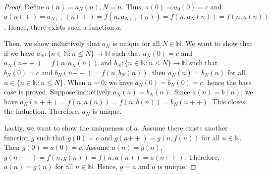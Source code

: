 \documentclass[12pt, letter]{article}
\begin{document}
\begin{proof}
    Define $a(n)=a_N(n), N=n$. Thus, $a(0)=a_0(0)=c$ and $a(n\mathtt{++})=a_{N\mathtt{++}}(n\mathtt{++})=f(n,a_{N\mathtt{++}}(n))=f(n,a_N(n))=f(n,a(n))$. Hence, there exists such a function $a$.

    Then, we show inductively that $a_N$ is unique for all $N\in\mathbb{N}$. We want to show that if we have $a_N:\{n\in\mathbb{N}:n\leq N\}\to \mathbb{N}$ such that $a_N(0)=c$ and $a_N(n\mathtt{++})=f(n,a_N(n))$
    and $b_N:\{n\in\mathbb{N}:n\leq N\}\to \mathbb{N}$ such that $b_N(0)=c$ and $b_N(n\mathtt{++})=f(n,b_N(n))$, then $a_N(n)=b_N(n)$ for all $n\in\{n\in\mathbb{N}:n\leq N\}$.
    When $n=0$, we have $a_N(0)=b_N(0)=c$, hence the base case is proved. Suppose inductively $a_N(n)=b_N(n)$. Since $a(n)=b(n)$, we have $a_N(n++)=f(n,a(n))=f(n,b(n))=b_N(n++)$. This closes the induction. 
    Therefore, $a_N$ is unique. 

    Lastly, we want to show the uniqueness of $a$. Assume there exists another function $g$ such that $g(0)=c$ and $g(n\mathtt{++})=g(n,f(n))$ for all $n\in \mathbb{N}$. Then $g(0)=a(0)=c$. Assume $a(n)=g(n)$, $g(n\mathtt{++})=f(n,g(n))=f(n,a(n))=a(n\mathtt{++})$. Therefore, $a(n)=g(n)$ for all $n\in \mathbb{N}$. 
    Hence, $g=a$ and $a$ is unique.
\end{proof}
\end{document}
